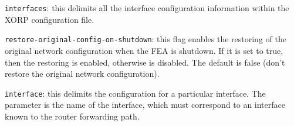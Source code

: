 \begin{description}
\item{\tt interfaces}: this delimits all the interface configuration
  information within the XORP configuration file.

\item{\tt restore-original-config-on-shutdown}: this flag enables the
  restoring of the original network configuration when the FEA is
  shutdown. If it is set to true, then the restoring is enabled,
  otherwise is disabled. The default is {\stt false} (\ie don't restore
  the original network configuration).

\item{\tt interface}: this delimits the configuration for a particular
  interface.  The parameter is the name of the interface, which must
  correspond to an interface known to the router forwarding path.


\end{description}
